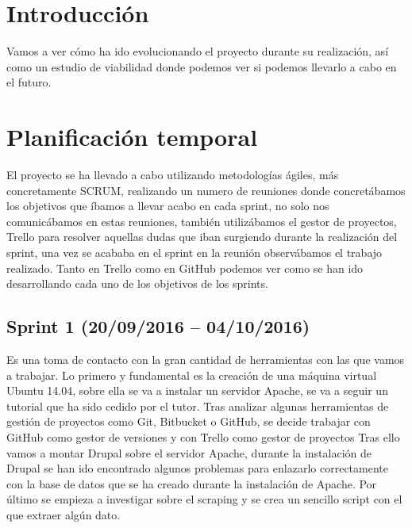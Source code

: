 
\section{Introducción}

Vamos a ver cómo ha ido evolucionando el proyecto durante su realización, así como un estudio de viabilidad donde podemos ver si podemos llevarlo a cabo en el futuro.\cite{wiki:latex}

\section{Planificación temporal}
El proyecto se ha llevado a cabo utilizando metodologías ágiles, más concretamente SCRUM, realizando un numero de reuniones donde concretábamos los objetivos que íbamos a llevar acabo en cada sprint, no solo nos comunicábamos en estas reuniones, también utilizábamos el gestor de proyectos, Trello para resolver aquellas dudas que iban surgiendo durante la realización del sprint, una vez se acababa en el sprint en la reunión observábamos el trabajo realizado. Tanto en Trello como en GitHub podemos ver como se han ido desarrollando cada uno de los objetivos de los sprints.

\subsection{Sprint 1 (20/09/2016 – 04/10/2016)}
Es una toma de contacto con la gran cantidad de herramientas con las que vamos a trabajar. Lo primero y fundamental es la creación de una máquina virtual Ubuntu 14.04, sobre ella se va a instalar un servidor Apache, se va a seguir un tutorial que ha sido cedido por el tutor.
Tras analizar algunas herramientas de gestión de proyectos como Git, Bitbucket o GitHub, se decide trabajar con GitHub como gestor de versiones y con Trello como gestor de proyectos
Tras ello vamos a montar Drupal sobre el servidor Apache, durante la instalación de Drupal se han ido encontrado algunos problemas para enlazarlo correctamente con la base de datos que se ha creado durante la instalación de Apache.
Por último se empieza a investigar sobre el scraping y se crea un sencillo script con el que extraer algún dato.


